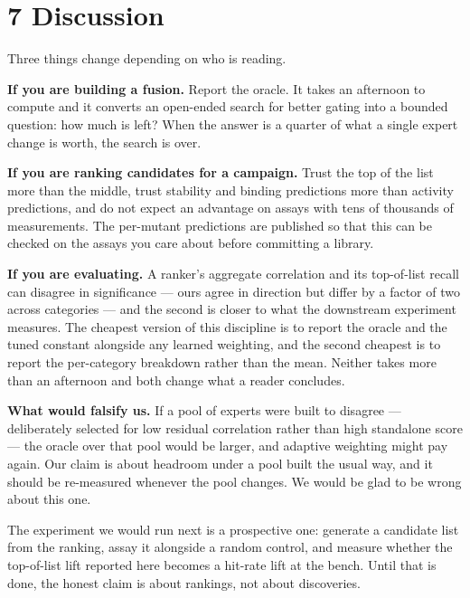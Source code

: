 \documentclass[sigconf,review,nonacm]{acmart}
\begin{document}
\hypertarget{discussion}{%
\section{7 Discussion}\label{discussion}}

Three things change depending on who is reading.

\textbf{If you are building a fusion.} Report the oracle. It takes an afternoon to compute and it converts an
open-ended search for better gating into a bounded question: how much is left? When the answer is a
quarter of what a single expert change is worth, the search is over.

\textbf{If you are ranking candidates for a campaign.} Trust the top of the list more than the middle, trust
stability and binding predictions more than activity predictions, and do not expect an advantage on
assays with tens of thousands of measurements. The per-mutant predictions are published so that this can
be checked on the assays you care about before committing a library.

\textbf{If you are evaluating.} A ranker's aggregate correlation and its top-of-list recall can disagree in
significance --- ours agree in direction but differ by a factor of two across categories --- and the second
is closer to what the downstream experiment measures. The cheapest version of this discipline is to
report the oracle and the tuned constant alongside any learned weighting, and the second cheapest is to
report the per-category breakdown rather than the mean. Neither takes more than an afternoon and both
change what a reader concludes.

\textbf{What would falsify us.} If a pool of experts were built to disagree --- deliberately selected for low
residual correlation rather than high standalone score --- the oracle over that pool would be larger, and
adaptive weighting might pay again. Our claim is about headroom under a pool built the usual way, and it
should be re-measured whenever the pool changes. We would be glad to be wrong about this one.

The experiment we would run next is a prospective one: generate a candidate list from the ranking, assay
it alongside a random control, and measure whether the top-of-list lift reported here becomes a hit-rate
lift at the bench. Until that is done, the honest claim is about rankings, not about discoveries.
\end{document}
